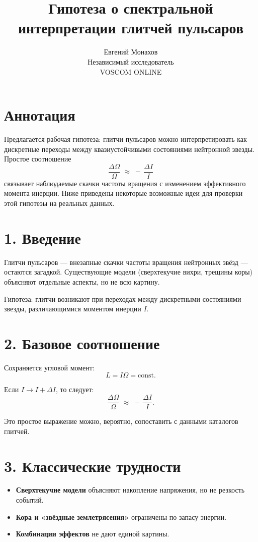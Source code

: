 \documentclass[a4paper,12pt]{article}
\begin{document}
\title{Гипотеза о спектральной интерпретации глитчей пульсаров}
\author{Евгений Монахов \\ Независимый исследователь \\ VOSCOM ONLINE}
\date{}
\maketitle

\section*{Аннотация}
Предлагается рабочая гипотеза: глитчи пульсаров можно интерпретировать как дискретные переходы между квазиустойчивыми состояниями нейтронной звезды. Простое соотношение
\[
\frac{\Delta \Omega}{\Omega} \;\approx\; -\, \frac{\Delta I}{I}
\]
связывает наблюдаемые скачки частоты вращения с изменением эффективного момента инерции. Ниже приведены некоторые возможные идеи для проверки этой гипотезы на реальных данных.

\section*{1. Введение}
Глитчи пульсаров --- внезапные скачки частоты вращения нейтронных звёзд --- остаются загадкой. Существующие модели (сверхтекучие вихри, трещины коры) объясняют отдельные аспекты, но не всю картину.  

Гипотеза: глитчи возникают при переходах между дискретными состояниями звезды, различающимися моментом инерции $I$.

\section*{2. Базовое соотношение}
Сохраняется угловой момент:
\[
L = I \Omega = \text{const}.
\]

Если $I \to I + \Delta I$, то следует:
\[
\frac{\Delta \Omega}{\Omega} \;\approx\; -\, \frac{\Delta I}{I}.
\]

Это простое выражение можно, вероятно, сопоставить с данными каталогов глитчей.

\section*{3. Классические трудности}
\begin{itemize}
  \item \textbf{Сверхтекучие модели} объясняют накопление напряжения, но не резкость событий.
  \item \textbf{Кора и «звёздные землетрясения»} ограничены по запасу энергии.
  \item \textbf{Комбинации эффектов} не дают единой картины.
\end{itemize}
\end{document}
